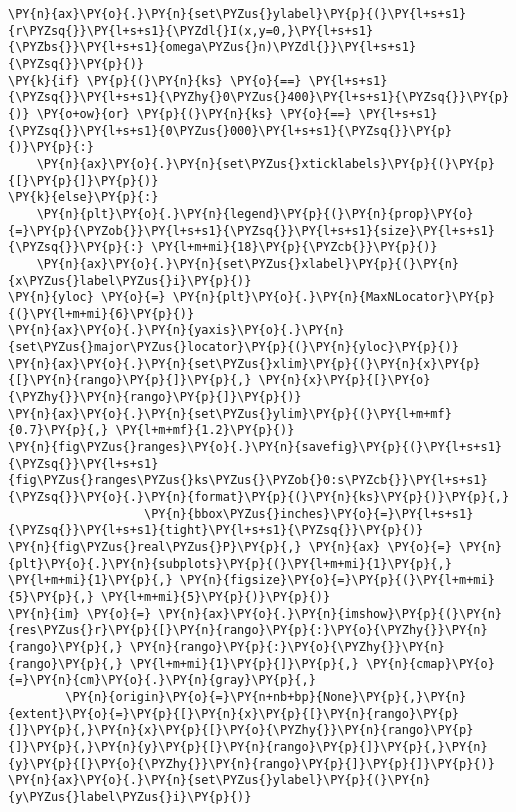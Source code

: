 \begin{Verbatim}[commandchars=\\\{\}]
\PY{n}{ax}\PY{o}{.}\PY{n}{set\PYZus{}ylabel}\PY{p}{(}\PY{l+s+s1}{r\PYZsq{}}\PY{l+s+s1}{\PYZdl{}I(x,y=0,}\PY{l+s+s1}{\PYZbs{}}\PY{l+s+s1}{omega\PYZus{}n)\PYZdl{}}\PY{l+s+s1}{\PYZsq{}}\PY{p}{)}
\PY{k}{if} \PY{p}{(}\PY{n}{ks} \PY{o}{==} \PY{l+s+s1}{\PYZsq{}}\PY{l+s+s1}{\PYZhy{}0\PYZus{}400}\PY{l+s+s1}{\PYZsq{}}\PY{p}{)} \PY{o+ow}{or} \PY{p}{(}\PY{n}{ks} \PY{o}{==} \PY{l+s+s1}{\PYZsq{}}\PY{l+s+s1}{0\PYZus{}000}\PY{l+s+s1}{\PYZsq{}}\PY{p}{)}\PY{p}{:}
    \PY{n}{ax}\PY{o}{.}\PY{n}{set\PYZus{}xticklabels}\PY{p}{(}\PY{p}{[}\PY{p}{]}\PY{p}{)}
\PY{k}{else}\PY{p}{:}
    \PY{n}{plt}\PY{o}{.}\PY{n}{legend}\PY{p}{(}\PY{n}{prop}\PY{o}{=}\PY{p}{\PYZob{}}\PY{l+s+s1}{\PYZsq{}}\PY{l+s+s1}{size}\PY{l+s+s1}{\PYZsq{}}\PY{p}{:} \PY{l+m+mi}{18}\PY{p}{\PYZcb{}}\PY{p}{)}
    \PY{n}{ax}\PY{o}{.}\PY{n}{set\PYZus{}xlabel}\PY{p}{(}\PY{n}{x\PYZus{}label\PYZus{}i}\PY{p}{)}
\PY{n}{yloc} \PY{o}{=} \PY{n}{plt}\PY{o}{.}\PY{n}{MaxNLocator}\PY{p}{(}\PY{l+m+mi}{6}\PY{p}{)}
\PY{n}{ax}\PY{o}{.}\PY{n}{yaxis}\PY{o}{.}\PY{n}{set\PYZus{}major\PYZus{}locator}\PY{p}{(}\PY{n}{yloc}\PY{p}{)}
\PY{n}{ax}\PY{o}{.}\PY{n}{set\PYZus{}xlim}\PY{p}{(}\PY{n}{x}\PY{p}{[}\PY{n}{rango}\PY{p}{]}\PY{p}{,} \PY{n}{x}\PY{p}{[}\PY{o}{\PYZhy{}}\PY{n}{rango}\PY{p}{]}\PY{p}{)}
\PY{n}{ax}\PY{o}{.}\PY{n}{set\PYZus{}ylim}\PY{p}{(}\PY{l+m+mf}{0.7}\PY{p}{,} \PY{l+m+mf}{1.2}\PY{p}{)}
\PY{n}{fig\PYZus{}ranges}\PY{o}{.}\PY{n}{savefig}\PY{p}{(}\PY{l+s+s1}{\PYZsq{}}\PY{l+s+s1}{fig\PYZus{}ranges\PYZus{}ks\PYZus{}\PYZob{}0:s\PYZcb{}}\PY{l+s+s1}{\PYZsq{}}\PY{o}{.}\PY{n}{format}\PY{p}{(}\PY{n}{ks}\PY{p}{)}\PY{p}{,}
                   \PY{n}{bbox\PYZus{}inches}\PY{o}{=}\PY{l+s+s1}{\PYZsq{}}\PY{l+s+s1}{tight}\PY{l+s+s1}{\PYZsq{}}\PY{p}{)}
\PY{n}{fig\PYZus{}real\PYZus{}P}\PY{p}{,} \PY{n}{ax} \PY{o}{=} \PY{n}{plt}\PY{o}{.}\PY{n}{subplots}\PY{p}{(}\PY{l+m+mi}{1}\PY{p}{,} \PY{l+m+mi}{1}\PY{p}{,} \PY{n}{figsize}\PY{o}{=}\PY{p}{(}\PY{l+m+mi}{5}\PY{p}{,} \PY{l+m+mi}{5}\PY{p}{)}\PY{p}{)}
\PY{n}{im} \PY{o}{=} \PY{n}{ax}\PY{o}{.}\PY{n}{imshow}\PY{p}{(}\PY{n}{res\PYZus{}r}\PY{p}{[}\PY{n}{rango}\PY{p}{:}\PY{o}{\PYZhy{}}\PY{n}{rango}\PY{p}{,} \PY{n}{rango}\PY{p}{:}\PY{o}{\PYZhy{}}\PY{n}{rango}\PY{p}{,} \PY{l+m+mi}{1}\PY{p}{]}\PY{p}{,} \PY{n}{cmap}\PY{o}{=}\PY{n}{cm}\PY{o}{.}\PY{n}{gray}\PY{p}{,}
        \PY{n}{origin}\PY{o}{=}\PY{n+nb+bp}{None}\PY{p}{,}\PY{n}{extent}\PY{o}{=}\PY{p}{[}\PY{n}{x}\PY{p}{[}\PY{n}{rango}\PY{p}{]}\PY{p}{,}\PY{n}{x}\PY{p}{[}\PY{o}{\PYZhy{}}\PY{n}{rango}\PY{p}{]}\PY{p}{,}\PY{n}{y}\PY{p}{[}\PY{n}{rango}\PY{p}{]}\PY{p}{,}\PY{n}{y}\PY{p}{[}\PY{o}{\PYZhy{}}\PY{n}{rango}\PY{p}{]}\PY{p}{]}\PY{p}{)}
\PY{n}{ax}\PY{o}{.}\PY{n}{set\PYZus{}ylabel}\PY{p}{(}\PY{n}{y\PYZus{}label\PYZus{}i}\PY{p}{)}

\end{Verbatim}
